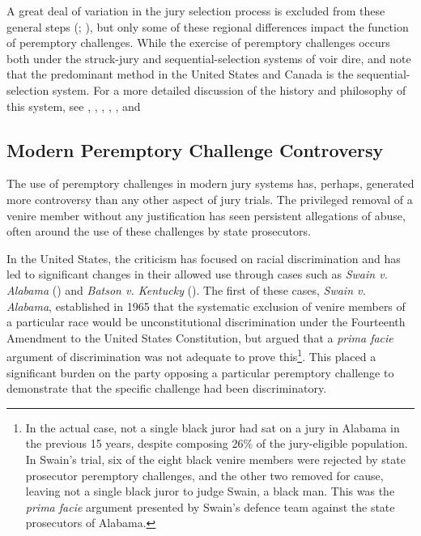 A great deal of variation in the jury selection process is excluded from these general steps (\cite{vandykejurysel}; \cite{hansvidjudging}), but only some of these regional differences impact the function of peremptory challenges. While the exercise of peremptory challenges occurs both under the struck-jury and sequential-selection systems of voir dire, \cite{ford2010} and \cite{vandykejurysel} note that the predominant method in the United States and Canada is the sequential-selection system. For a more detailed discussion of the history and philosophy of this system, see \cite{vonmosch1921}, \cite{hoffman1997},  \cite{woolley2018}, \cite{rvsherratt}, \cite{hansvidjudging}, and \cite{vandykejurysel}

\subsection{Modern Peremptory Challenge Controversy} \label{sec:modper}

The use of peremptory challenges in modern jury systems has, perhaps, generated more controversy than any other aspect of jury trials. The privileged
removal of a venire member without any justification
has seen persistent allegations of abuse, often around the use of these challenges by state prosecutors.

In the United States, the criticism has focused on racial discrimination and has led to significant changes in their allowed use
through cases such as \textit{Swain v. Alabama} (\cite{swainvalabama}) and \textit{Batson v. Kentucky}
(\cite{batsonvkentucky}). The first of these cases, \textit{Swain v. Alabama}, established in 1965 that the systematic exclusion
of venire members of a particular race would be unconstitutional discrimination under the Fourteenth Amendment to the United
States Constitution, but argued that a \textit{prima facie} argument of discrimination was not adequate to prove this\footnote{In the actual case, not a single
  black juror had sat on a jury in Alabama in the previous 15 years,
  despite composing 26\% of the jury-eligible population. In Swain's trial, six of the eight black venire members were rejected by
  state prosecutor peremptory challenges, and the other two removed for cause, leaving not a single black juror to judge Swain, a
  black man. This was the \textit{prima facie} argument presented by Swain's defence team against the state prosecutors of Alabama.}. This placed a significant burden on the party opposing a
particular peremptory challenge to demonstrate that the specific challenge had been discriminatory.

